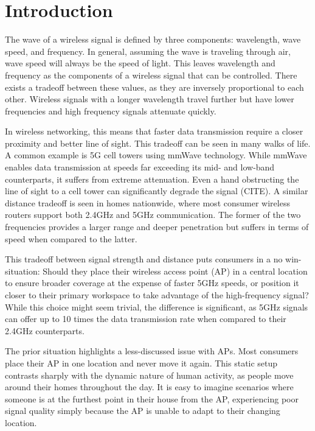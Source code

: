 \section{Introduction}
The wave of a wireless signal is defined by three components: wavelength, wave speed, and frequency. In general, assuming the wave is traveling through air, wave speed will always be the speed of light. This leaves wavelength and frequency as the components of a wireless signal that can be controlled.  There exists a tradeoff between these values, as they are inversely proportional to each other. Wireless signals with a longer wavelength travel further but have lower frequencies and high frequency signals attenuate quickly. 

In wireless networking, this means that faster data transmission require a closer proximity and better line of sight. This tradeoff can be seen in many walks of life. A common example is 5G cell towers using mmWave technology. While mmWave enables data transmission at speeds far exceeding its mid- and low-band counterparts, it suffers from extreme attenuation. Even a hand obstructing the line of sight to a cell tower can significantly degrade the signal (CITE). A similar distance tradeoff is seen in homes nationwide, where most consumer wireless routers support both 2.4GHz and 5GHz communication. The former of the two frequencies provides a larger range and deeper penetration but suffers in terms of speed when compared to the latter. 

This tradeoff between signal strength and distance puts consumers in a no win-situation: Should they place their wireless access point (AP) in a central location to ensure broader coverage at the expense of faster 5GHz speeds, or position it closer to their primary workspace to take advantage of the high-frequency signal? While this choice might seem trivial, the difference is significant, as 5GHz signals can offer up to 10 times the data transmission rate when compared to their 2.4GHz counterparts. 

The prior situation highlights a less-discussed issue with APs. Most consumers place their AP in one location and never move it again. This static setup contrasts sharply with the dynamic nature of human activity, as people move around their homes throughout the day. It is easy to imagine scenarios where someone is at the furthest point in their house from the AP, experiencing poor signal quality simply because the AP is unable to adapt to their changing location.

